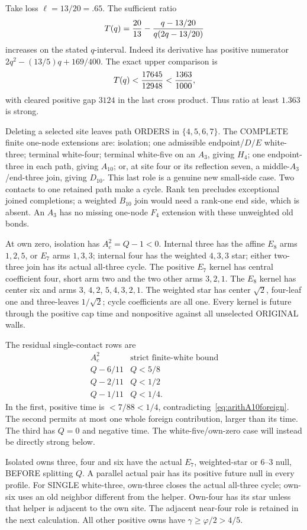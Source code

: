 \documentclass[11pt]{article}
\begin{document}
Take loss \(\ell=13/20=.65\).
The sufficient ratio
\[
 T(q)={20\over13}
       -{q-13/20\over q(2q-13/20)}
\]
increases on the stated \(q\)-interval.
Indeed its derivative has positive numerator
\(2q^2-(13/5)q+169/400\).
The exact upper comparison is
\[
 T(q)<{17645\over12948}<{1363\over1000},
\]
with cleared positive gap \(3124\) in the
last cross product.
Thus ratio at least \(1.363\) is strong.

Deleting a selected site leaves path ORDERS
in \(\{4,5,6,7\}\).
The COMPLETE finite one-node extensions are:
isolation; one admissible endpoint/\(D/E\)
white-three; terminal white-four; terminal
white-five on an \(A_3\), giving \(H_4\);
one endpoint-three in each path, giving
\(A_{10}\); or, at site four or its
reflection seven, a middle-\(A_3\)/end-three
join, giving \(D_{10}\).
This last role is a genuine new small-side
case.  Two contacts to one retained path
make a cycle.  Rank ten precludes exceptional
joined completions; a weighted \(B_{10}\)
join would need a rank-one end side, which
is absent.  An \(A_3\) has no missing
one-node \(F_4\) extension with these
unweighted old bonds.

At own zero, isolation has \(A_c^2=Q-1<0\).
Internal three has the affine \(E_8\) arms
\(1,2,5\), or \(E_7\) arms \(1,3,3\);
internal four has the weighted \(4,3,3\)
star; either two-three join has its actual
all-three cycle.
The positive \(E_7\) kernel has central
coefficient four, short arm two and the
two other arms \(3,2,1\).
The \(E_8\) kernel has center six and
arms \(3\), \(4,2\), \(5,4,3,2,1\).
The weighted star has center \(\sqrt2\),
four-leaf one and three-leaves \(1/\sqrt2\);
cycle coefficients are all one.
Every kernel is future through the positive
cap time and nonpositive against all
unselected ORIGINAL walls.

The residual single-contact rows are
\[
 \begin{array}{c|c}
 A_c^2&\text{strict finite-white bound}\\ \hline
 Q-6/11&Q<5/8\\
 Q-2/11&Q<1/2\\
 Q-1/11&Q<1/4 .
 \end{array}
\]
In the first, positive time is \(<7/88<1/4\),
contradicting~\eqref{eq:arithA10foreign}.
The second permits at most one whole
foreign contribution, larger than its time.
The third has \(Q=0\) and negative time.
The white-five/own-zero case will instead
be directly strong below.

Isolated owns three, four and six have
the actual \(E_7\), weighted-star or
\(6\)--\(3\) null, BEFORE splitting \(Q\).
A parallel actual pair has its positive
future null in every profile.
For SINGLE white-three, own-three closes
the actual all-three cycle; own-six uses
an old neighbor different from the helper.
Own-four has its star unless that helper
is adjacent to the own site.
The adjacent near-four role is retained
in the next calculation.
All other positive owns have
\(\gamma\ge\varphi/2>4/5\).
\end{document}
